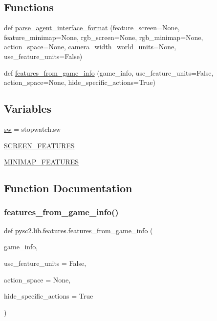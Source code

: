 \subsection*{Functions}
\begin{DoxyCompactItemize}
\item 
def \mbox{\hyperlink{namespacepysc2_1_1lib_1_1features_a5075b8a72e7dbe879edda0d3dbe902fe}{parse\+\_\+agent\+\_\+interface\+\_\+format}} (feature\+\_\+screen=None, feature\+\_\+minimap=None, rgb\+\_\+screen=None, rgb\+\_\+minimap=None, action\+\_\+space=None, camera\+\_\+width\+\_\+world\+\_\+units=None, use\+\_\+feature\+\_\+units=False)
\item 
def \mbox{\hyperlink{namespacepysc2_1_1lib_1_1features_a633aa1ab712129e68a37ec8e7ddbef10}{features\+\_\+from\+\_\+game\+\_\+info}} (game\+\_\+info, use\+\_\+feature\+\_\+units=False, action\+\_\+space=None, hide\+\_\+specific\+\_\+actions=True)
\end{DoxyCompactItemize}
\subsection*{Variables}
\begin{DoxyCompactItemize}
\item 
\mbox{\hyperlink{namespacepysc2_1_1lib_1_1features_a062cf1836da62c7466fa1666e71541d3}{sw}} = stopwatch.\+sw
\item 
\mbox{\hyperlink{namespacepysc2_1_1lib_1_1features_a13e90de46283a5e5191bab0451492127}{S\+C\+R\+E\+E\+N\+\_\+\+F\+E\+A\+T\+U\+R\+ES}}
\item 
\mbox{\hyperlink{namespacepysc2_1_1lib_1_1features_aa68d4b004db555d191b198bcf0d0e699}{M\+I\+N\+I\+M\+A\+P\+\_\+\+F\+E\+A\+T\+U\+R\+ES}}
\end{DoxyCompactItemize}


\subsection{Function Documentation}
\mbox{\label{namespacepysc2_1_1lib_1_1features_a633aa1ab712129e68a37ec8e7ddbef10}} 
\subsubsection{\texorpdfstring{features\+\_\+from\+\_\+game\+\_\+info()}{features\_from\_game\_info()}}
{\footnotesize\ttfamily def pysc2.\+lib.\+features.\+features\+\_\+from\+\_\+game\+\_\+info (\begin{DoxyParamCaption}\item[{}]{game\+\_\+info,  }\item[{}]{use\+\_\+feature\+\_\+units = {\ttfamily False},  }\item[{}]{action\+\_\+space = {\ttfamily None},  }\item[{}]{hide\+\_\+specific\+\_\+actions = {\ttfamily True} }\end{DoxyParamCaption})}

